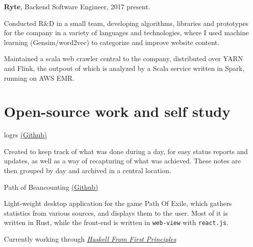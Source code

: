 \documentclass[a4paper]{article}
\renewenvironment{itemize}{
  \begin{list}{}{
    \setlength{\leftmargin}{1.5em}
  }
}{
  \end{list}
}
\newenvironment{packed}{
\begin{itemize}
  \setlength{\itemsep}{0pt}
  \setlength{\parskip}{0pt}
  \setlength{\parsep}{0pt}
}{\end{itemize}}
\begin{document}
\begin{itemize}
\item \textbf{Ryte}, Backend Software Engineer, 2017 {\textendash}
  present.
        \begin{itemize}
            \item Conducted R\&D in a small team, developing algorithms,
              libraries and prototypes for the company in a variety of languages
              and technologies, where I used machine learning (Gensim/word2vec)
              to categorize and improve website content.
            \item Maintained a scala web crawler central to the company,
              distributed over YARN and Flink, the outpout of which is analyzed
              by a Scala service written in Spark, running on AWS EMR.
        \end{itemize}
\end{itemize}

\pagebreak
\section*{Open-source work and self study}

\begin{itemize}
  \item logrs \href{https://github.com/MordecaiMalignatus/logrs}{(Github)}
    \begin{packed}
      \item Created to keep track of what was done during a day, for easy status
        reports and updates, as well as a way of recapturing of what was
        achieved. These notes are then grouped by day and archived in a central
        location.
    \end{packed}
  \item{Path of Beancounting \href{https://github.com/MordecaiMalignatus/path-of-beancounting}{(Github)}}
    \begin{packed}
    \item Light-weight desktop application for the game Path Of Exile, which
      gathers statistics from various sources, and displays them to the
      user. Most of it is written in Rust, while the front-end is written in
      {\tt web-view} with {\tt react.js}.
    \end{packed}
  \item Currently working through \href{http://haskellbook.com}{\emph{Haskell From First Principles}}
\end{itemize}
\end{document}
